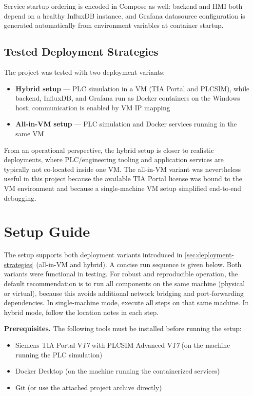 \documentclass[a4paper,11pt]{article}
\begin{document}
Service startup ordering is encoded in Compose as well: backend and HMI both depend on a healthy
InfluxDB instance, and Grafana datasource configuration is generated automatically from environment
variables at container startup.

\subsection{Tested Deployment Strategies}
\label{sec:deployment-strategies}

The project was tested with two deployment variants:

\begin{itemize}
    \item \textbf{Hybrid setup} --- PLC simulation in a VM (TIA Portal and PLCSIM), while backend,
    InfluxDB, and Grafana run as Docker containers on the Windows host; communication is enabled by
    VM IP mapping
    \item \textbf{All-in-VM setup} --- PLC simulation and Docker services running in the same VM
\end{itemize}

From an operational perspective, the hybrid setup is closer to realistic deployments, where
PLC/engineering tooling and application services are typically not co-located inside one VM. The
all-in-VM variant was nevertheless useful in this project because the available TIA Portal license
was bound to the VM environment and because a single-machine VM setup simplified end-to-end
debugging.

\section{Setup Guide}

The setup supports both deployment variants introduced in
\autoref{sec:deployment-strategies} (all-in-VM and hybrid). A concise run sequence
is given below. Both variants were functional in testing. For robust and reproducible operation,
the default recommendation is to run all components on the same machine (physical or virtual),
because this avoids additional network bridging and port-forwarding dependencies. In
single-machine mode, execute all steps on that same machine. In hybrid mode, follow the location
notes in each step.

\textbf{Prerequisites.} The following tools must be installed before running the setup:

\begin{itemize}
    \item Siemens TIA Portal V\textit{17} with PLCSIM Advanced V\textit{17}
    (on the machine running the PLC simulation)
    \item Docker Desktop (on the machine running the containerized services)
    \item Git (or use the attached project archive directly)
\end{itemize}
\end{document}
